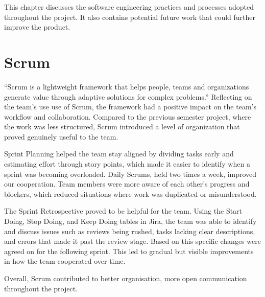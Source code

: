 \hspace*{1cm} This chapter discusses the software engineering practices and processes adopted throughout the project. It also contains potential future work that could further improve the product. 

\section{Scrum}
\hspace*{1cm} ``Scrum is a lightweight framework that helps people, teams and organizations generate value through adaptive solutions for complex problems.''\cite{scrumguide} Reflecting on the team's use use of Scrum, the framework had a positive impact on the team's workflow and collaboration. Compared to the previous semester project, where the work was less structured, Scrum introduced a level of organization that proved genuinely useful to the team.

\hspace*{1cm}Sprint Planning helped the team stay aligned by dividing tasks early and estimating effort through story points, which made it easier to identify when a sprint was becoming overloaded. Daily Scrums, held two times a week, improved our cooperation. Team members were more aware of each other's progress and blockers, which reduced situations where work was duplicated or misunderstood.

\hspace*{1cm}The Sprint Retrospective proved to be helpful for the team. Using the Start Doing, Stop Doing, and Keep Doing tables in Jira, the team was able to identify and discuss issues such as reviews being rushed, tasks lacking clear descriptions, and errors that made it past the review stage. Based on this specific changes were agreed on for the following sprint. This led to gradual but visible improvements in how the team cooperated over time.

\hspace*{1cm}Overall, Scrum contributed to better organisation, more open communication throughout the project.

